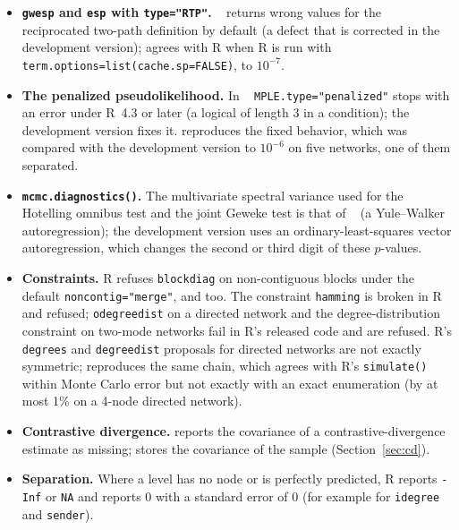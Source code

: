 \begin{itemize}
  \item \textbf{\texttt{gwesp} and \texttt{esp} with \texttt{type="RTP"}.} \ergm{}~\ergmver{} returns wrong values for the reciprocated two-path definition by default (a defect that is corrected in the development version); \nwergm{} agrees with R when R is run with \texttt{term.options=list(cache.sp=FALSE)}, to $10^{-7}$.
  \item \textbf{The penalized pseudolikelihood.} In \ergm{}~\ergmver{} \texttt{MPLE.type="penalized"} stops with an error under R~4.3 or later (a logical of length 3 in a condition); the development version fixes it. \nwergm{} reproduces the fixed behavior, which was compared with the development version to $10^{-6}$ on five networks, one of them separated.
  \item \textbf{\texttt{mcmc.diagnostics()}.} The multivariate spectral variance used for the Hotelling omnibus test and the joint Geweke test is that of \ergm{}~\ergmver{} (a Yule--Walker autoregression); the development version uses an ordinary-least-squares vector autoregression, which changes the second or third digit of these $p$-values.
  \item \textbf{Constraints.} R refuses \texttt{blockdiag} on non-contiguous blocks under the default \texttt{noncontig="merge"}, and \nwergm{} too. The constraint \texttt{hamming} is broken in R and refused; \texttt{odegreedist} on a directed network and the degree-distribution constraint on two-mode networks fail in R's released code and are refused. R's \texttt{degrees} and \texttt{degreedist} proposals for directed networks are not exactly symmetric; \nwergm{} reproduces the same chain, which agrees with R's \texttt{simulate()} within Monte Carlo error but not exactly with an exact enumeration (by at most 1\% on a 4-node directed network).
  \item \textbf{Contrastive divergence.} \ergm{} reports the covariance of a contrastive-divergence estimate as missing; \nwergm{} stores the covariance of the sample (Section~\ref{sec:cd}).
  \item \textbf{Separation.} Where a level has no node or is perfectly predicted, R reports \texttt{-Inf} or \texttt{NA} and \nwergm{} reports 0 with a standard error of 0 (for example for \texttt{idegree} and \texttt{sender}).
\end{itemize}

